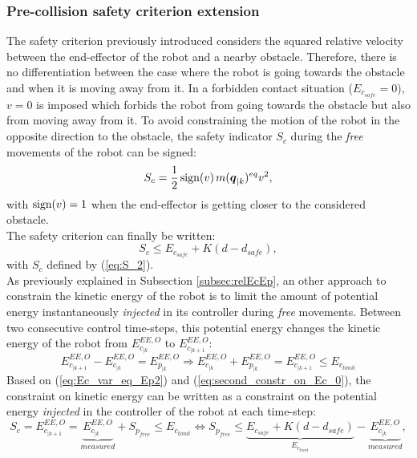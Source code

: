 \subsubsection{Pre-collision safety criterion extension}
The safety criterion previously introduced considers the squared relative velocity between the end-effector of the robot and a nearby obstacle. Therefore, there is no differentiation between the case where the robot is going towards the obstacle and when it is moving away from it. In a forbidden contact situation ($E_{c_{safe}} = 0$), $v = 0$ is imposed which forbids the robot from going towards the obstacle but also from moving away from it. To avoid constraining the motion of the robot in the opposite direction to the obstacle, the safety indicator $S_c$ during the \textit{free} movements of the robot can be signed:
\begin{equation}
S_c = \frac{1}{2} \hspace{0.5mm} \textnormal{sign(} v \textnormal{)} \hspace{0.5mm} m(\mbox{\boldmath${q}$}_{|k})^{eq} v^2,
\label{eq:S_2}
\end{equation}
with $\textnormal{sign}(v) = 1$ when the end-effector  is getting closer to the considered obstacle. 
\\
The safety criterion can finally be written: 
\begin{equation}
S_c \leq E_{c_{safe}} +  K (d - d_{safe}),
\end{equation}
with $S_c$ defined by (\ref{eq:S_2}). \\
As previously explained in Subsection \ref{subsec:relEcEp}, an other approach to constrain the kinetic energy of the robot is to limit the amount of potential energy instantaneously \textit{injected} in its controller during  \textit{free} movements. Between two consecutive control time-steps, this potential energy changes the kinetic energy of the robot from $E_{c_{|k}}^{EE,O}$ to $E_{c_{|k+1}}^{EE,O}$:
\begin{equation}
E_{c_{|k+1}}^{EE,O} - E_{c_{|k}}^{EE,O} = E_{p_{|k}}^{EE,O} \Rightarrow E_{c_{|k}}^{EE,O} + E_{p_{|k}}^{EE,O} = E_{c_{|k+1}}^{EE,O} \leq E_{c_{limit}}
\label{eq:second_constr_on_Ec_0}
\end{equation}
Based on (\ref{eq:Ec_var_eq_Ep2}) and (\ref{eq:second_constr_on_Ec_0}), the constraint on kinetic energy can be written as a constraint on the potential energy \textit{injected} in the controller of the robot at each time-step: 
\begin{equation}
S_c = E_{c_{|k+1}}^{EE,O} = \underbrace{E_{c_{|k}}^{EE,O}}_{measured} + S_{p_{free}} \leq E_{c_{limit}} \Leftrightarrow S_{p_{free}} \leq \underbrace{E_{c_{safe}} +  K (d - d_{safe})}_{E_{c_{limit}}} - \underbrace{E_{c_{|k}}^{EE,O}}_{measured},
\label{eq:second_constr_on_Ec}
\end{equation}
